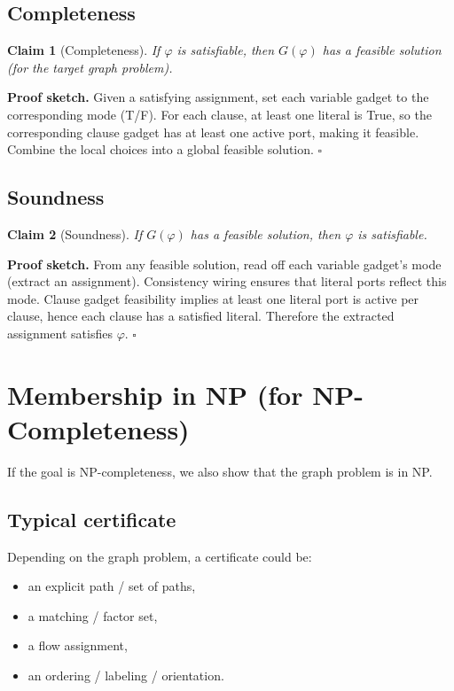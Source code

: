 \documentclass[11pt]{article}
\newtheorem{claim}{Claim}
\begin{document}
\subsection{Completeness}
\begin{claim}[Completeness]
If $\varphi$ is satisfiable, then $G(\varphi)$ has a feasible solution (for the target graph problem).
\end{claim}
\noindent \textbf{Proof sketch.}
Given a satisfying assignment, set each variable gadget to the corresponding mode (T/F). For each clause, at least one literal is True, so the corresponding clause gadget has at least one active port, making it feasible. Combine the local choices into a global feasible solution. \hfill $\square$

\subsection{Soundness}
\begin{claim}[Soundness]
If $G(\varphi)$ has a feasible solution, then $\varphi$ is satisfiable.
\end{claim}
\noindent \textbf{Proof sketch.}
From any feasible solution, read off each variable gadget's mode (extract an assignment). Consistency wiring ensures that literal ports reflect this mode. Clause gadget feasibility implies at least one literal port is active per clause, hence each clause has a satisfied literal. Therefore the extracted assignment satisfies $\varphi$. \hfill $\square$

\section{Membership in NP (for NP-Completeness)}
If the goal is NP-completeness, we also show that the graph problem is in NP.

\subsection*{Typical certificate}
Depending on the graph problem, a certificate could be:
\begin{itemize}[itemsep=2pt]
  \item an explicit path / set of paths,
  \item a matching / factor set,
  \item a flow assignment,
  \item an ordering / labeling / orientation.
\end{itemize}
\end{document}
